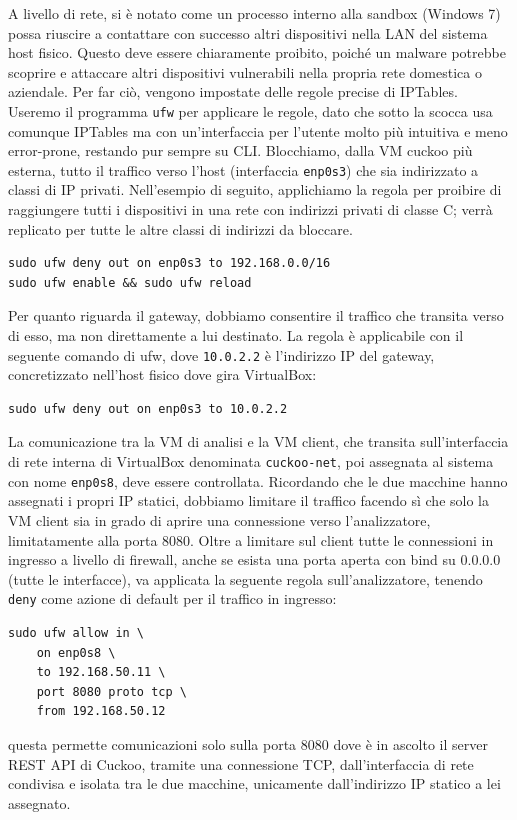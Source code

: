 A livello di rete, si è notato come un processo interno alla sandbox (Windows 7) possa riuscire a contattare con successo altri dispositivi nella LAN del sistema host fisico. Questo deve essere chiaramente proibito, poiché un malware potrebbe scoprire e attaccare altri dispositivi vulnerabili nella propria rete domestica o aziendale.
Per far ciò, vengono impostate delle regole precise di IPTables. Useremo il programma \texttt{ufw} per applicare le regole, dato che sotto la scocca usa comunque IPTables ma con un'interfaccia per l'utente molto più intuitiva e meno error-prone, restando pur sempre su CLI.
Blocchiamo, dalla VM cuckoo più esterna, tutto il traffico verso l'host (interfaccia \texttt{enp0s3}) che sia indirizzato a classi di IP privati. Nell'esempio di seguito, applichiamo la regola per proibire di raggiungere tutti i dispositivi in una rete con indirizzi privati di classe C; verrà replicato per tutte le altre classi di indirizzi da bloccare.

\begin{verbatim}
sudo ufw deny out on enp0s3 to 192.168.0.0/16
sudo ufw enable && sudo ufw reload
\end{verbatim}

Per quanto riguarda il gateway, dobbiamo consentire il traffico che transita verso di esso, ma non direttamente a lui destinato. La regola è applicabile con il seguente comando di ufw, dove \texttt{10.0.2.2} è l'indirizzo IP del gateway, concretizzato nell'host fisico dove gira VirtualBox:

\begin{verbatim}
sudo ufw deny out on enp0s3 to 10.0.2.2
\end{verbatim}

La comunicazione tra la VM di analisi e la VM client, che transita sull'interfaccia di rete interna di VirtualBox denominata \texttt{cuckoo-net}, poi assegnata al sistema con nome \texttt{enp0s8}, deve essere controllata.
Ricordando che le due macchine hanno assegnati i propri IP statici, dobbiamo limitare il traffico facendo sì che solo la VM client sia in grado di aprire una connessione verso l'analizzatore, limitatamente alla porta 8080. Oltre a limitare sul client tutte le connessioni in ingresso a livello di firewall, anche se esista una porta aperta con bind su 0.0.0.0 (tutte le interfacce), va applicata la seguente regola sull'analizzatore, tenendo \texttt{deny} come azione di default per il traffico in ingresso:
\begin{verbatim}
sudo ufw allow in \
    on enp0s8 \
    to 192.168.50.11 \
    port 8080 proto tcp \
    from 192.168.50.12
\end{verbatim}
questa permette comunicazioni solo sulla porta 8080 dove è in ascolto il server REST API di Cuckoo, tramite una connessione TCP, dall'interfaccia di rete condivisa e isolata tra le due macchine, unicamente dall'indirizzo IP statico a lei assegnato.


